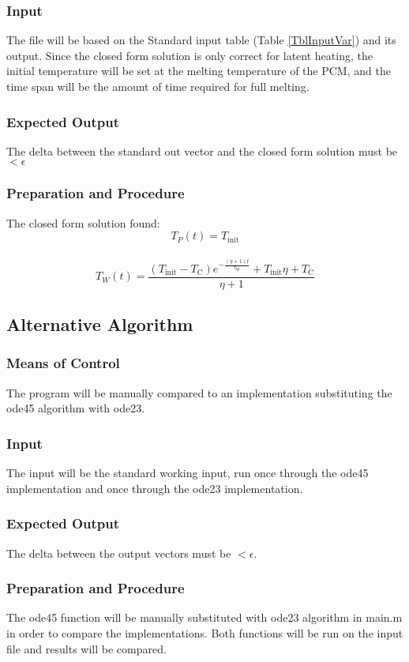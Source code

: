 \documentclass[12pt]{article}
\begin{document}
\subsubsection{Input}
The file will be based on the Standard input table (Table \ref{TblInputVar}) and its output. Since the closed
 form solution is only correct for latent heating, the initial temperature will
  be set at the melting temperature of the PCM, and the time span will be the 
  amount of time required for full melting.

\subsubsection{Expected Output}
The delta between the standard out vector and the closed form solution must be 
$< \epsilon$

\subsubsection{Preparation and Procedure}
The closed form solution found:
$$ T_P(t) = T_{\text{init}}$$
\\
$$T_W(t) = \frac{(T_{\text{init}}-T_{\text{C}})e^{-\frac{(\eta+1)t}{\tau_{\text{W}}}}+T_{\text{init}}\eta+T_{\text{C}}}{\eta+1}
$$



\subsection{Alternative Algorithm}
\subsubsection{Means of Control}
The program will be manually compared to an implementation substituting the ode45
 algorithm with ode23. 

\subsubsection{Input}
The input will be the standard working input, run once through the ode45 implementation
 and once through the ode23 implementation. 

\subsubsection{Expected Output}
The delta between the output vectors must be 
$< \epsilon$.

\subsubsection{Preparation and Procedure}
The ode45 function will be manually substituted with ode23 algorithm in main.m in order to compare the implementations. Both functions will be run on the input file and results will be compared.
\end{document}
